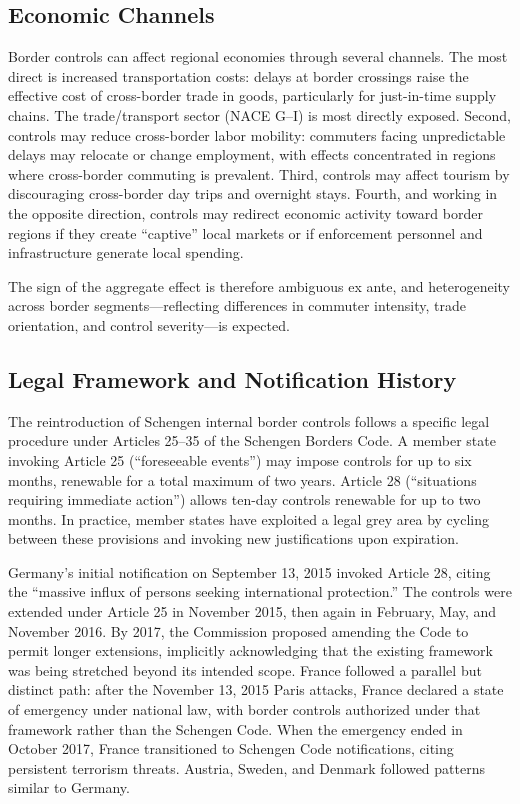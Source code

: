 \documentclass[12pt]{article}
\begin{document}
\subsection{Economic Channels}

Border controls can affect regional economies through several channels. The most direct is increased transportation costs: delays at border crossings raise the effective cost of cross-border trade in goods, particularly for just-in-time supply chains. The trade/transport sector (NACE G--I) is most directly exposed. Second, controls may reduce cross-border labor mobility: commuters facing unpredictable delays may relocate or change employment, with effects concentrated in regions where cross-border commuting is prevalent. Third, controls may affect tourism by discouraging cross-border day trips and overnight stays. Fourth, and working in the opposite direction, controls may redirect economic activity toward border regions if they create ``captive'' local markets or if enforcement personnel and infrastructure generate local spending.

The sign of the aggregate effect is therefore ambiguous ex ante, and heterogeneity across border segments---reflecting differences in commuter intensity, trade orientation, and control severity---is expected.

\subsection{Legal Framework and Notification History}

The reintroduction of Schengen internal border controls follows a specific legal procedure under Articles 25--35 of the Schengen Borders Code. A member state invoking Article 25 (``foreseeable events'') may impose controls for up to six months, renewable for a total maximum of two years. Article 28 (``situations requiring immediate action'') allows ten-day controls renewable for up to two months. In practice, member states have exploited a legal grey area by cycling between these provisions and invoking new justifications upon expiration.

Germany's initial notification on September 13, 2015 invoked Article 28, citing the ``massive influx of persons seeking international protection.'' The controls were extended under Article 25 in November 2015, then again in February, May, and November 2016. By 2017, the Commission proposed amending the Code to permit longer extensions, implicitly acknowledging that the existing framework was being stretched beyond its intended scope. France followed a parallel but distinct path: after the November 13, 2015 Paris attacks, France declared a state of emergency under national law, with border controls authorized under that framework rather than the Schengen Code. When the emergency ended in October 2017, France transitioned to Schengen Code notifications, citing persistent terrorism threats. Austria, Sweden, and Denmark followed patterns similar to Germany.
\end{document}
